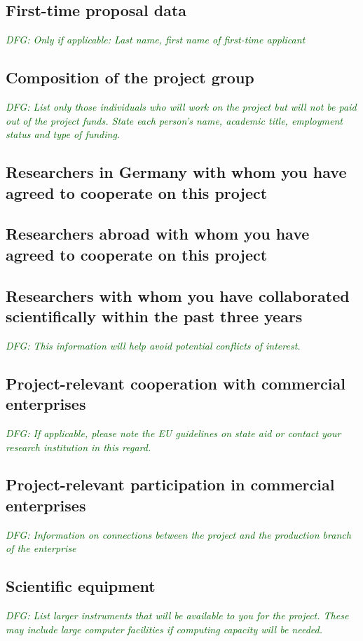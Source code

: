 \documentclass[a4paper,11pt]{amsart}
\theoremstyle{definition}
\newcommand{\<}{\langle}
\renewcommand{\>}{\rangle}
\newcommand{\dfg}[1]{\emph{\textcolor{darkgreen}{DFG: #1}}}
\begin{document}
\subsection{First-time proposal data}
\dfg{Only if applicable: Last name, first name of first-time
  applicant}

\subsection{Composition of the project group}
\dfg{List only those individuals who will work on the project but will
  not be paid out of the project funds. State each person's name,
  academic title, employment status and type of funding.}

\subsection{Researchers in Germany with whom you have agreed to cooperate on this project}

\subsection{Researchers abroad with whom you have agreed to cooperate on this project}

\subsection{Researchers with whom you have collaborated scientifically within the past three years}
\dfg{This information will help avoid potential conflicts of interest.}

\subsection{Project-relevant cooperation with commercial enterprises}
\dfg{If applicable, please note the EU guidelines on state aid or
  contact your research institution in this regard.}

\subsection{Project-relevant participation in commercial enterprises}
\dfg{Information on connections between the project and the production
  branch of the enterprise}

\subsection{Scientific equipment}
\dfg{List larger instruments that will be available to you for the
  project. These may include large computer facilities if computing
  capacity will be needed.}
\end{document}
